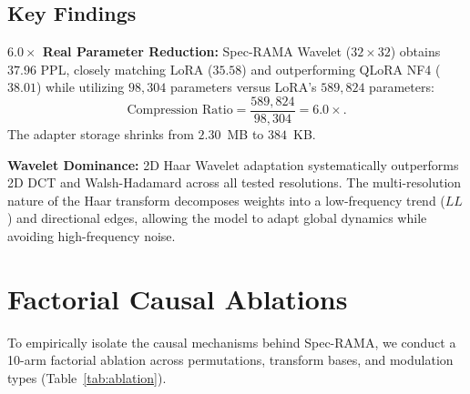 \documentclass{article}
\begin{document}
\subsection{Key Findings}

\textbf{$6.0\times$ Real Parameter Reduction:} Spec-RAMA Wavelet ($32\times 32$) obtains $37.96$ PPL, closely matching LoRA ($35.58$) and outperforming QLoRA NF4 ($38.01$) while utilizing $98,304$ parameters versus LoRA's $589,824$ parameters:
\begin{equation}
\text{Compression Ratio} = \frac{589,824}{98,304} = \mathbf{6.0\times}.
\end{equation}
The adapter storage shrinks from $2.30$~MB to $384$~KB.

\textbf{Wavelet Dominance:} 2D Haar Wavelet adaptation systematically outperforms 2D DCT and Walsh-Hadamard across all tested resolutions. The multi-resolution nature of the Haar transform decomposes weights into a low-frequency trend ($LL$) and directional edges, allowing the model to adapt global dynamics while avoiding high-frequency noise.

\section{Factorial Causal Ablations}

To empirically isolate the causal mechanisms behind Spec-RAMA, we conduct a 10-arm factorial ablation across permutations, transform bases, and modulation types (Table~\ref{tab:ablation}).
\end{document}
